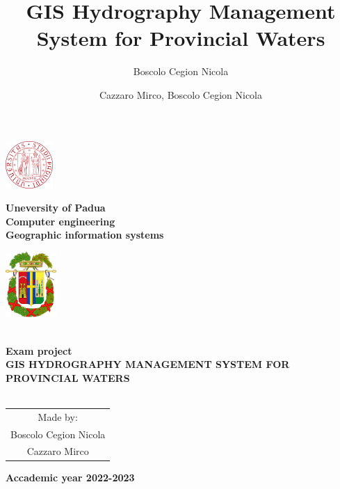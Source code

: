 \documentclass[a4paper, 11pt]{article}
\title{GIS Hydrography Management System for Provincial Waters}
\author{Boscolo Cegion Nicola}
\author{Cazzaro Mirco, Boscolo Cegion Nicola}
\date{}
\begin{document}
\begin{center}
	\begin{minipage}{2.5cm}
	\begin{center}
		\includegraphics[height=1.8cm]{img/unipd.png}
		
	\end{center}
\end{minipage}\hfill
\begin{minipage}{10cm}
	\begin{center}
	\textbf{Uneversity of Padua}\\[0.1cm]
    \textbf{Computer engineering}\\[0.1cm]
    \textbf{Geographic information systems}


	\end{center}
\end{minipage}\hfill
\begin{minipage}{2.5cm}
	\begin{center}
		\includegraphics[height=2.5cm]{img/belluno.png}
	\end{center}

\end{minipage}



\textsc{\Large }\\[1.5cm]
{\large \bfseries Exam project}\\[4.5cm]


{\huge \bfseries \uppercase{GIS Hydrography Management System for Provincial Waters} \\[0.5cm] }
\textsc{\Large }\\[2.5cm]







\begin{tabular}{c}
    Made by:\\[0.5cm]
    {\LARGE Boscolo Cegion Nicola}\\[0.1cm]
    {\LARGE Cazzaro Mirco}\\[0.1cm]
    
\end{tabular}
\vfill

{\textbf{\large {Accademic year} 2022-2023}}

\end{center}


\pagebreak
\tableofcontents







\end{document}
